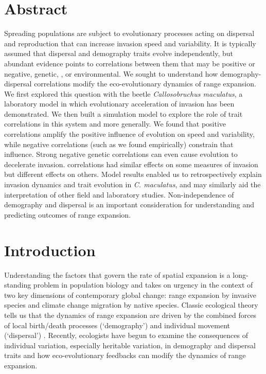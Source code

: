 \documentclass[11pt]{article}
\newcommand{\revise}[1]{{\color{Mahogany}{#1}}}
\begin{document}
\section*{Abstract}
Spreading populations are subject to evolutionary processes acting on dispersal and reproduction that can increase invasion speed and variability. It is typically assumed that dispersal and demography traits evolve independently, but abundant evidence points to correlations between them that may be positive or negative, genetic, \revise{maternal}, or  environmental. We sought to understand how demography-dispersal correlations modify the eco-evolutionary dynamics of range expansion. We first explored this question with the beetle \textit{Callosobruchus maculatus}, a laboratory model in which evolutionary acceleration of invasion has been demonstrated. We then built a simulation model to explore the role of trait correlations in this system and more generally. We found that positive correlations amplify the positive influence of evolution on speed and variability, while negative correlations (such as we found empirically) constrain that influence. Strong negative genetic correlations can even cause evolution to decelerate invasion. \revise{Genetic and non-genetic (maternal and environmental)} correlations had similar effects on some measures of invasion but different effects on others. Model results enabled us to retrospectively explain invasion dynamics and trait evolution in \textit{C. maculatus}, and may similarly aid the interpretation of other field and laboratory studies. Non-independence of demography and dispersal is an important consideration for understanding and predicting outcomes of range expansion.


\newpage{}

\section*{Introduction}
Understanding the factors that govern the rate of spatial expansion is a long-standing problem in population biology and takes on urgency in the context of two key dimensions of contemporary global change: range expansion by invasive species and climate change migration by native species.
Classic ecological theory tells us that the dynamics of range expansion are driven by the combined forces of local birth/death processes (`demography') and individual movement (`dispersal') \citep{skellam_random_1951,okubo_diffusion_1980,kot_discrete-time_1986,kot_dispersal_1996}.
Recently, ecologists have begun to examine the consequences of individual variation, especially heritable variation, in demography and dispersal traits and how eco-evolutionary feedbacks can modify the dynamics of range expansion.
\end{document}

